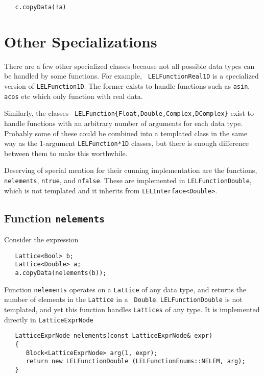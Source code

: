 \begin{verbatim}
   c.copyData(!a)
\end{verbatim}


\section {Other Specializations}


There are a few other specialized classes because not all possible data
types can be handled by some functions.  For example, {\tt
LELFunctionReal1D} is a specialized version of {\tt LELFunction1D}.  The
former exists to handle functions such as {\tt asin}, {\tt acos} etc
which only function with real data. 

Similarly, the classes {\tt
LELFunction\{Float,Double,Complex,DComplex\}} exist to handle functions
with an arbitrary number of arguments for each data type.  Probably some
of these could be combined into a templated class in the same way as the
1-argument {\tt LELFunction*1D} classes, but there is enough difference
between them to make this worthwhile. 

Deserving of special mention for their cunning implementation are the
functions, {\tt nelements}, {\tt ntrue}, and {\tt nfalse}.  These are
implemented in {\tt LELFunctionDouble}, which is not templated and it
inherits from {\tt LELInterface<Double>}. 

\subsection {Function {\tt nelements}}

Consider the expression

\begin{verbatim}
   Lattice<Bool> b;
   Lattice<Double> a;
   a.copyData(nelements(b));
\end{verbatim}


Function {\tt nelements} operates on a {\tt Lattice} of any data type,
and returns the number of elements in the {\tt Lattice} in a {\tt
Double}.  {\tt LELFunctionDouble} is not templated, and yet this
function handles {\tt Lattices} of any type.  It is implemented directly
in {\tt LatticeExprNode}

\begin{verbatim}
   LatticeExprNode nelements(const LatticeExprNode& expr)
   {
      Block<LatticeExprNode> arg(1, expr);
      return new LELFunctionDouble (LELFunctionEnums::NELEM, arg);
   }
\end{verbatim}


